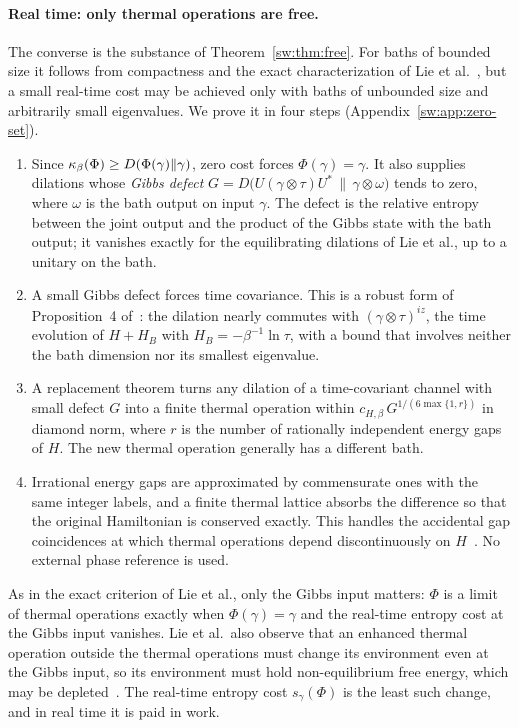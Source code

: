 \paragraph{Real time: only thermal operations are free.} The converse is the substance of Theorem~\ref{sw:thm:free}. For baths of bounded size it follows from compactness and the exact characterization of Lie et al.~\cite{LieEtAl26}, but a small real-time cost may be achieved only with baths of unbounded size and arbitrarily small eigenvalues. We prove it in four steps (Appendix~\ref{sw:app:zero-set}).
\begin{enumerate}[label=(\roman*)]
\item Since $\kappa_\beta(\Phi)\ge D(\Phi(\gamma)\|\gamma)$, zero cost forces $\Phi(\gamma)=\gamma$. It also supplies dilations whose \emph{Gibbs defect} $G=D\bigl(U(\gamma\otimes\tau)U^*\,\big\|\,\gamma\otimes\omega\bigr)$ tends to zero, where $\omega$ is the bath output on input $\gamma$. The defect is the relative entropy between the joint output and the product of the Gibbs state with the bath output; it vanishes exactly for the equilibrating dilations of Lie et al., up to a unitary on the bath.
\item A small Gibbs defect forces time covariance. This is a robust form of Proposition~4 of~\cite{LieEtAl26}: the dilation nearly commutes with $(\gamma\otimes\tau)^{iz}$, the time evolution of $H+H_B$ with $H_B=-\beta^{-1}\ln\tau$, with a bound that involves neither the bath dimension nor its smallest eigenvalue.
\item A replacement theorem turns any dilation of a time-covariant channel with small defect $G$ into a finite thermal operation within $c_{H,\beta}\,G^{1/(6\max\{1,r\})}$ in diamond norm, where $r$ is the number of rationally independent energy gaps of $H$. The new thermal operation generally has a different bath.
\item Irrational energy gaps are approximated by commensurate ones with the same integer labels, and a finite thermal lattice absorbs the difference so that the original Hamiltonian is conserved exactly. This handles the accidental gap coincidences at which thermal operations depend discontinuously on $H$~\cite[Sec.~III]{vomEnde22}. No external phase reference is used.
\end{enumerate}
As in the exact criterion of Lie et al., only the Gibbs input matters: $\Phi$ is a limit of thermal operations exactly when $\Phi(\gamma)=\gamma$ and the real-time entropy cost at the Gibbs input vanishes. Lie et al.\ also observe that an enhanced thermal operation outside the thermal operations must change its environment even at the Gibbs input, so its environment must hold non-equilibrium free energy, which may be depleted~\cite{LieEtAl26}. The real-time entropy cost $s_\gamma(\Phi)$ is the least such change, and in real time it is paid in work.

